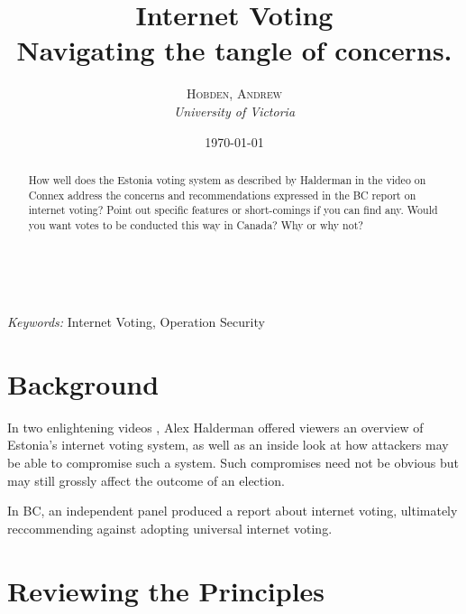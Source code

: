 \documentclass[a4paper, 11pt]{article} %
\title{
    \textbf{Internet Voting}\\ %
    Navigating the tangle of concerns.
} %
\author{\textsc{Hobden, Andrew} %
\\{\textit{University of Victoria}}} %
\date{\today} %
\makeatletter
\renewcommand{\maketitle}{ %
\begin{flushright} %
{\LARGE\@title} %

\vspace{50pt} %

{\large\@author} %
\\\@date %

\vspace{40pt} %
\end{flushright}
}
\makeatother
\begin{document}
\maketitle %



\begin{abstract}
    How well does the Estonia voting system as described by Halderman in the video on Connex address the concerns and recommendations expressed in the BC report on internet voting?  Point out specific features or short-comings if you can find any. Would you want votes to be conducted this way in Canada? Why or why not?
\end{abstract}

\hspace*{3,6mm}\textit{Keywords:} Internet Voting, Operation Security %

\vspace{30pt} %


\section*{Background}

In two enlightening videos \cite{halderman-estonia-presentation} \cite{halderman-estonia-video}, Alex Halderman offered viewers an overview of Estonia's internet voting system, as well as an inside look at how attackers may be able to compromise such a system. Such compromises need not be obvious but may still grossly affect the outcome of an election.

In BC, an independent panel produced a report \cite{internet-voting-report} about internet voting, ultimately reccommending against adopting universal internet voting.


\section*{Reviewing the Principles}
\end{document}
